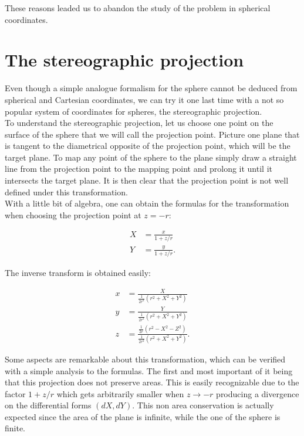 These reasons leaded us to abandon the study of the problem in spherical coordinates.\\


\section{The stereographic projection}
Even though a simple analogue formalism for the sphere cannot be deduced from spherical and Cartesian coordinates, we can try it one last time with a not so popular system of coordinates for spheres, the stereographic projection.\\

To understand the stereographic projection, let us choose one point on the surface of the sphere that we will call the projection point. Picture one plane that is tangent to the diametrical opposite of the projection point, which will be the target plane. To map any point of the sphere to the plane simply draw a straight line from the projection point to the mapping point and prolong it until it intersects the target plane. It is then clear that the projection point is not well defined under this transformation.\\

With a little bit of algebra, one can obtain the formulas for the transformation when choosing the projection point at $z=-r$:

\begin{align*}
X &= \frac{x}{1+z/r}\\
Y &= \frac{y}{1+z/r}.
\end{align*}

The inverse transform is obtained easily:

\begin{align*}
x &= \frac{X}{\frac{1}{2r^2}(r^2+X^2+Y^2)}\\
y &= \frac{Y}{\frac{1}{2r^2}(r^2+X^2+Y^2)}\\
z &= \frac{\frac{1}{2r}(r^2-X^2-Z^2)}{\frac{1}{2r^2}(r^2+X^2+Y^2)}.
\end{align*}

Some aspects are remarkable about this transformation, which can be verified with a simple analysis to the formulas. The first and most important of it being that this projection does not preserve areas. This is easily recognizable due to the factor $1+z/r$ which gets arbitrarily smaller when $z\to -r$ producing a divergence on the differential forms $(dX,dY)$. This non area conservation is actually expected since the area of the plane is infinite, while the one of the sphere is finite.\\

